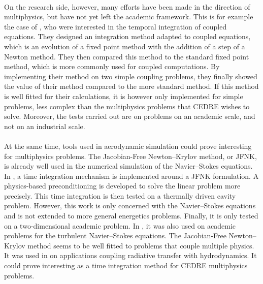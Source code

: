     \paragraph{}
    On the research side, however, many efforts have been made in the direction of multiphysics, but have not yet left the academic framework.
    This is for example the case of \cite{WongKwokHorneEtAl2019}, who were interested in the temporal integration of coupled equations.
    They designed an integration method adapted to coupled equations, which is an evolution of a fixed point method with the addition of a step of a Newton method.
    They then compared this method to the standard fixed point method, which is more commonly used for coupled computations.
    By implementing their method on two simple coupling problems, they finally showed the value of their method compared to the more standard method.
    If this method is well fitted for their calculations, it is however only implemented for simple problems, less complex than the multiphysics problems that CEDRE wishes to solve.
    Moreover, the tests carried out are on problems on an academic scale, and not on an industrial scale.

    \paragraph{}
    At the same time, tools used in aerodynamic simulation could prove interesting for multiphysics problems.
    The Jacobian-Free Newton--Krylov method, or JFNK, is already well used in the numerical simulation of the Navier--Stokes equations.
    In \cite{ParkNourgalievMartineauEtAl2009}, a time integration mechanism is implemented around a JFNK formulation.
    A physics-based preconditioning is developed to solve the linear problem more precisely.
    This time integration is then tested on a thermally driven cavity problem.
    However, this work is only concerned with the Navier--Stokes equations and is not extended to more general energetics problems.
    Finally, it is only tested on a two-dimensional academic problem.
    In \cite{ContentOuttierCinnella2013}, it was also used on academic problems for the turbulent Navier--Stokes equations.
    The Jacobian-Free Newton--Krylov method seems to be well fitted to problems that couple multiple physics.
    It was used in \cite{Turpault2003} on applications coupling radiative transfer with hydrodynamics.
    It could prove interesting as a time integration method for CEDRE multiphysics problems.

